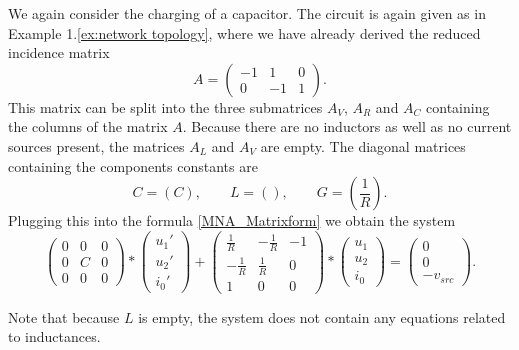 \begin{example1}
	\label{ex:MNA}
	We again consider the charging of a capacitor. The circuit is again given as in Example 1.\ref{ex:network topology}, where we have already derived the reduced incidence matrix
	\begin{displaymath}
		A = 
		\left(
		\begin{matrix}
			-1 & 1 & 0 \\
			0 & -1 & 1 
		\end{matrix}
		\right).
	\end{displaymath} 
	This matrix can be split into the three submatrices $A_V$, $A_R$ and $A_C$ containing the columns of the matrix $A$. Because there are no inductors as well as no current sources present, the matrices $A_L$ and $A_V$ are empty. The diagonal matrices containing the components constants are
	\begin{displaymath}
		C = (C), \qquad L = (), \qquad G = (\frac{1}{R}).
	\end{displaymath}
	Plugging this into the formula \eqref{MNA_Matrixform} we obtain the system
	\begin{equation}
		\label{eq:ex1 MNA}
		\begin{pmatrix}
			0 & 0 & 0 \\
			0 & C & 0 \\
			0 & 0 & 0
		\end{pmatrix}
		*
		\begin{pmatrix}
			u_1' \\
			u_2' \\
			i_0'
		\end{pmatrix}
		+
		\begin{pmatrix}
			\frac{1}{R} & -\frac{1}{R} & -1 \\
			-\frac{1}{R} & \frac{1}{R} & 0 \\
			1 & 0 & 0 
		\end{pmatrix}
		*
		\begin{pmatrix}
			u_1 \\
			u_2 \\
			i_0
		\end{pmatrix}
		=
		\begin{pmatrix}
			0 \\
			0 \\
			-v_{src}
		\end{pmatrix}.
	\end{equation}
	
	Note that because $L$ is empty, the system does not contain any equations related to inductances.
\end{example1}


